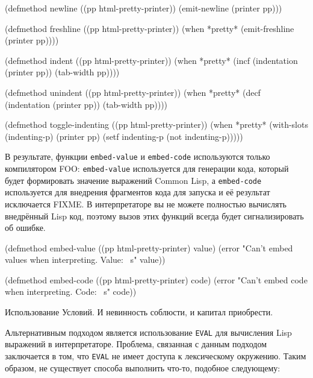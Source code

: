 \begin{myverb}
(defmethod newline ((pp html-pretty-printer))
  (emit-newline (printer pp)))

(defmethod freshline ((pp html-pretty-printer))
  (when *pretty* (emit-freshline (printer pp))))

(defmethod indent ((pp html-pretty-printer))
  (when *pretty* 
    (incf (indentation (printer pp)) (tab-width pp))))

(defmethod unindent ((pp html-pretty-printer))
  (when *pretty* 
    (decf (indentation (printer pp)) (tab-width pp))))

(defmethod toggle-indenting ((pp html-pretty-printer))
  (when *pretty* 
    (with-slots (indenting-p) (printer pp)
      (setf indenting-p (not indenting-p)))))
\end{myverb}

В результате, функции \lstinline{embed-value} и \lstinline{embed-code} используются только
компилятором FOO: \lstinline{embed-value} используется для генерации кода, который будет
формировать значение выражений Common Lisp, а \lstinline{embed-code} используется для внедрения
фрагментов кода для запуска и её результат исключается FIXME. В интерпретаторе вы не
можете полностью вычислять внедрённый Lisp код, поэтому вызов этих функций всегда будет
сигнализировать об ошибке.

\begin{myverb}
(defmethod embed-value ((pp html-pretty-printer) value)
  (error "Can't embed values when  interpreting. Value: ~s" value))

(defmethod embed-code ((pp html-pretty-printer) code)
  (error "Can't embed code when interpreting. Code: ~s" code))
\end{myverb}


Использование Условий. И невинность соблюсти, и капитал приобрести.


Альтернативным подходом является использование \lstinline{EVAL} для вычисления Lisp выражений в
интерпретаторе. Проблема, связанная с данным подходом заключается в том, что \lstinline{EVAL}
не имеет доступа к лексическому окружению. Таким образом, не существует способа выполнить
что-то, подобное следующему:

